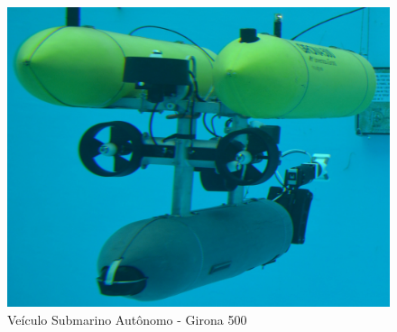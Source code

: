 \begin{figure}[H]
 	\centering
 	\includegraphics[scale=0.1]{./Resources/G500.jpg}
 	\caption{Veículo Submarino Autônomo - Girona 500}
 	\label{G500}
\end{figure}


